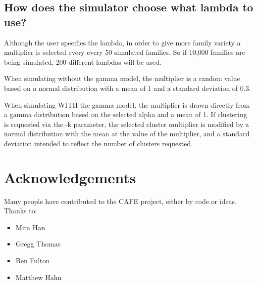 \documentclass{article}
\begin{document}
\subsection{How does the simulator choose what lambda to use?}

Although the user specifies the lambda, in order to give more
family variety a multiplier is selected every every 50 simulated families. So if 10,000 families are being simulated, 200 different lambdas will be used.

When simulating without the gamma model, the multiplier is a
random value based on a normal distribution
with a mean of 1 and a standard deviation of 0.3.

When simulating WITH the gamma model, the multiplier is drawn 
directly from a gamma distribution based on the selected alpha
and a mean of 1. If clustering is requested via the -k parameter,
the selected cluster multiplier is modified by a normal distribution
with the mean at the value of the multiplier, and a standard
deviation intended to reflect the number of clusters requested.

\section{Acknowledgements}
Many people have contributed to the CAFE project, either by code or ideas. Thanks to:
\begin{itemize}
  \item Mira Han
  \item Gregg Thomas
  \item Ben Fulton
  \item Matthew Hahn
\end{itemize}


\end{document}
